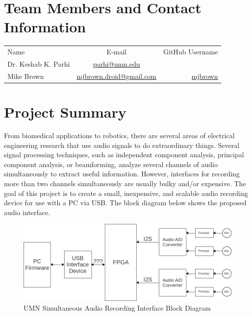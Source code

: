 \documentclass[10pt]{article}
\begin{document}
\section{Team Members and Contact Information}
\begin{tabular}[width=6.5in]{l c r}
Name & E-mail & GitHub Username \\
Dr. Keshab K. Parhi & \href{mailto:parhi@umn.edu}{parhi@umn.edu} & \\
Mike Brown & \href{mailto:mjbrown.droid@gmail.com}{mjbrown.droid@gmail.com} & \href{http://www.github.com/mjbrown}{mjbrown} \\
\end{tabular}
\section{Project Summary}
From biomedical applications to robotics, there are several areas of electrical engineering research that use audio signals to do extraordinary things.  Several signal processing techniques, such as independent component analysis, principal component analysis, or beamforming, analyze several channels of audio simultaneously to extract useful information.  However, interfaces for recording more than two channels simultaneously are usually bulky and/or expensive.  The goal of this project is to create a small, inexpensive, and scalable audio recording device for use with a PC via USB.  The block diagram below shows the proposed audio interface.
\begin{figure}[!h]
\centering
\includegraphics[width=6.5in]{block_diagram.png}
\caption{UMN Simultaneous Audio Recording Interface Block Diagram}
\label{fig:block_diagram}
\end{figure}
\end{document}
